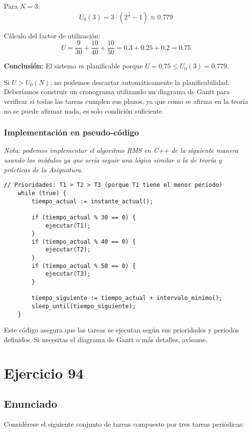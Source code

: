 \documentclass[a4paper,12pt]{article}
\begin{document}
Para \(N = 3\):
\[
U_0(3) = 3 \cdot (2^{\frac{1}{3}} - 1) \approx 0.779
\]

Cálculo del factor de utilización:
\[
U = \frac{9}{30} + \frac{10}{40} + \frac{10}{50} = 0.3 + 0.25 + 0.2 = 0.75
\]

\textbf{Conclusión:} El sistema es planificable porque \(U = 0.75 \leq U_0(3) = 0.779\).

Si \(U > U_0(N)\), no podemos descartar automáticamente la planificabilidad. Deberíamos construir un cronograma utilizando un diagrama de Gantt para verificar si todas las tareas cumplen sus plazos, ya que como se afirma en la teoría no se puede afirmar nada, es solo condición suficiente.

\subsubsection{Implementación en pseudo-código}

\textit{Nota: podemos implementar el algoritmo RMS en C++ de la siguiente manera usando los módulos ya que sería seguir una lógica similar a la de teoría y prácticas de la Asignatura.}

\begin{lstlisting}[style=customcpp, caption={Implementación en C++ del algoritmo RMS}]
    // Prioridades: T1 > T2 > T3 (porque T1 tiene el menor período)
    while (true) {
        tiempo_actual := instante_actual();
        
        if (tiempo_actual % 30 == 0) {
            ejecutar(T1);
        }
        if (tiempo_actual % 40 == 0) {
            ejecutar(T2);
        }
        if (tiempo_actual % 50 == 0) {
            ejecutar(T3);
        }
        
        tiempo_siguiente := tiempo_actual + intervalo_minimo();
        sleep_until(tiempo_siguiente);
    }
\end{lstlisting}

Este código asegura que las tareas se ejecutan según sus prioridades y periodos definidos. Si necesitas el diagrama de Gantt o más detalles, avísame.

\section{Ejercicio 94}
\subsection{Enunciado}
Considérese el siguiente conjunto de tareas compuesto por tres tareas periódicas:
\end{document}
